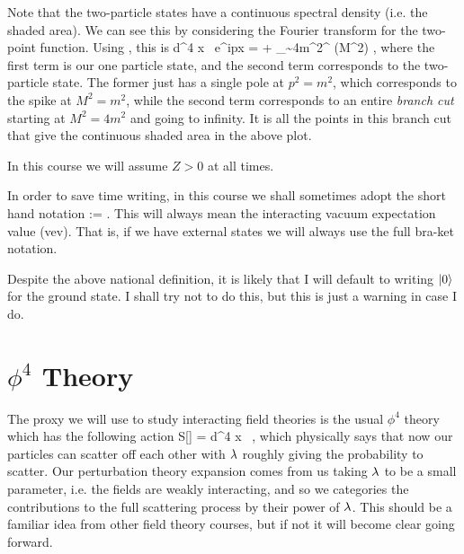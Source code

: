 \br 
    Note that the two-particle states have a continuous spectral density (i.e. the shaded area). We can see this by considering the Fourier transform for the two-point function. Using , this is 
    \bse 
        \int d^4 x \, e^{ip\cdot x} \bra{\Omega}\ket{\Omega} =  + \int_{\sim 4m^2}^{\infty}  \rho(M^2) ,
    \ese 
    where the first term is our one particle state, and the second term corresponds to the two-particle state. The former just has a single pole at $p^2=m^2$, which corresponds to the spike at $M^2=m^2$, while the second term corresponds to an entire \textit{branch cut} starting at $M^2=4m^2$ and going to infinity. It is all the points in this branch cut that give the continuous shaded area in the above plot. 
\er 

\br 
    In this course we will assume $Z>0$ at all times.
\er 

\bnn 
    In order to save time writing, in this course we shall sometimes adopt the short hand notation 
    \be 
    \label{eqn:VevNotation}
        \la \cT[...]\ra := \bra{\Omega} \cT[...]\ket{\Omega}.
    \ee 
    This will always mean the interacting vacuum expectation value (vev). That is, if we have external states we will always use the full bra-ket notation. 
\enn 

\br 
    Despite the above national definition, it is likely that I will default to writing $\ket{0}$ for the ground state. I shall try not to do this, but this is just a warning in case I do. 
\er 

\section{$\phi^4$ Theory}

The proxy we will use to study interacting field theories is the usual $\phi^4$ theory which has the following action
\be 
\label{eqn:Phi4Action}
    S[\phi] = \int d^4 x \, ,
\ee
which physically says that now our particles can scatter off each other with $\lambda$ roughly giving the probability to scatter. Our perturbation theory expansion comes from us taking $\lambda$ to be a small parameter, i.e. the fields are weakly interacting, and so we categories the contributions to the full scattering process by their power of $\lambda$. This should be a familiar idea from other field theory courses, but if not it will become clear going forward.

